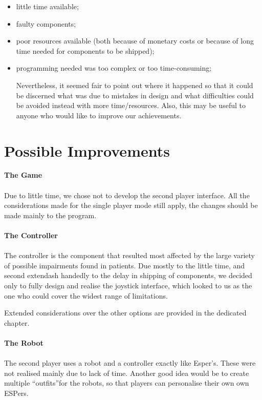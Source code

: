 \documentclass[a4paper,twoside]{book}
\begin{document}
\begin{itemize}
\item little time available;
\item faulty components;
\item poor resources available (both because of monetary costs or because of long time needed for components to be shipped);
\item programming needed was too complex or too time-consuming;

Nevertheless, it seemed fair to point out where it happened so that it could be discerned what was due to mistakes in design and what difficulties could be avoided instead with more time/resources. Also, this may be useful to anyone who would like to improve our achievements.
\end{itemize}

\section{Possible Improvements}

\textbf{The Game}
\\
\\
Due to little time, we chose not to develop the second player interface. All the considerations made for the single player mode still apply, the changes should be made mainly to the program.
\\
\\
\textbf{The Controller}
\\
\\
The controller is the component that resulted most affected by the large variety of possible impairments found in patients. Due mostly to the little time, and second	extendash handedly to the delay in shipping of components, we decided only to fully design and realise the joystick interface, which looked to us as the one who could cover the widest range of limitations.

Extended considerations over the other options are provided in the dedicated chapter.
\\
\\
\textbf{The Robot}
\\
\\
The second player uses a robot and a controller exactly like Esper's. These were not realised mainly due to lack of time. Another good idea would be to create multiple \textquotedblleft outfits\textquotedblright for the robots, so that players can  personalise their own own ESPers.
\end{document}
